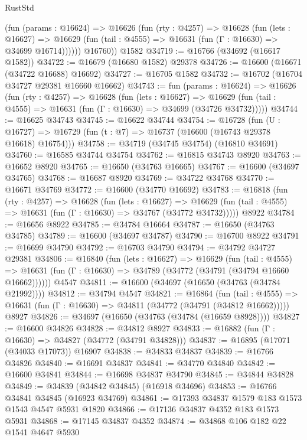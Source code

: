 \begin{lexlean}{RustStd}
\begin{coremodule}
          (fun (params : @16624) =>
          @16626
            (fun (rty : @4257) =>
            @16628
              (fun (lets : @16627) =>
              @16629 (fun (tail : @4555) => @16631 (fun (Γ : @16630) => @34699 @16714))))))
        @16760))
    @1582
@34719 := @16766 (@34692 (@16617 @1582))
@34722 := @16679 (@16680 @1582) @29378
@34726 := @16600 (@16671 (@34722 @16688) @16692)
@34727 := @16705 @1582
@34732 := @16702 (@16704 @34727 @29381 @16660 @16662)
@34743 := fun (params : @16624) =>
  @16626
    (fun (rty : @4257) =>
    @16628
      (fun (lets : @16627) =>
      @16629 (fun (tail : @4555) => @16631 (fun (Γ : @16630) => @34699 (@34726 @34732)))))
@34744 := @16625 @34743
@34745 := @16622 @34744
@34754 := @16728
    (fun (U : @16727) => @16729 (fun (t : @7) => @16737 (@16600 (@16743 @29378 @16618) @16754)))
@34758 := @34719 (@34745 @34754) (@16810 @34691)
@34760 := @16585 @34744 @34754
@34762 := @16815 @34743 @8920
@34763 := @16652 @8920
@34765 := @16650 (@34763 @16665)
@34767 := @16600 (@34697 @34765)
@34768 := @16687 @8920
@34769 := @34722 @34768
@34770 := @16671 @34769
@34772 := @16600 (@34770 @16692)
@34783 := @16818
    (fun (rty : @4257) =>
    @16628
      (fun (lets : @16627) =>
      @16629 (fun (tail : @4555) => @16631 (fun (Γ : @16630) => @34767 (@34772 @34732)))))
    @8922
@34784 := @16656 @8922
@34785 := @34784 @16664
@34787 := @16650 (@34763 @34785)
@34789 := @16600 (@34697 @34787)
@34790 := @16700 @8922
@34791 := @16699 @34790
@34792 := @16703 @34790
@34794 := @34792 @34727 @29381
@34806 := @16840
    (fun (lets : @16627) =>
    @16629
      (fun (tail : @4555) =>
      @16631 (fun (Γ : @16630) => @34789 (@34772 (@34791 (@34794 @16660 @16662))))))
    @4547
@34811 := @16600 (@34697 (@16650 (@34763 (@34784 @21992))))
@34812 := @34794 @4547
@34821 := @16864
    (fun (tail : @4555) => @16631 (fun (Γ : @16630) => @34811 (@34772 (@34791 (@34812 @16662)))))
    @8927
@34826 := @34697 (@16650 (@34763 (@34784 (@16659 @8928))))
@34827 := @16600 @34826
@34828 := @34812 @8927
@34833 := @16882 (fun (Γ : @16630) => @34827 (@34772 (@34791 @34828)))
@34837 := @16895 (@17071 (@34033 @17073)) @16907
@34838 := @34833 @34837
@34839 := @16766 @34826
@34840 := @16691 @34837
@34841 := @34770 @34840
@34842 := @16600 @34841
@34844 := @16698 @34837 @34790
@34845 := @34844 @34828
@34849 := @34839 (@34842 @34845) (@16918 @34696)
@34853 := @16766 @34841 @34845 (@16923 @34769)
@34861 := @17393 @34837 @1579 @183 @1573 @1543 @4547 @5931 @1820
@34866 := @17136 @34837 @4352 @183 @1573 @5931
@34868 := @17145 @34837 @4352
@34874 := @34868 @106 @182 @22 @1541 @4647 @5930

\end{coremodule}
\end{lexlean}
